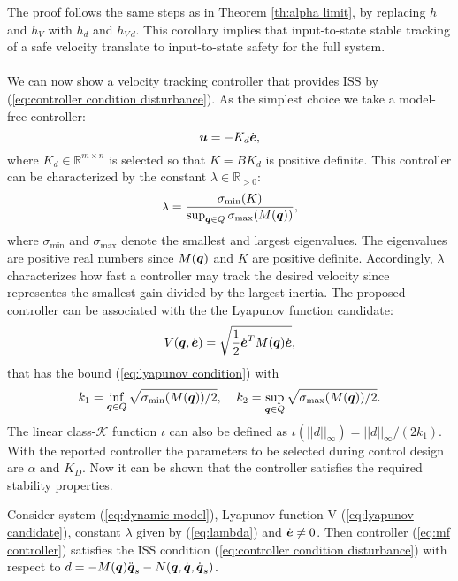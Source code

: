 The proof follows the same steps as in Theorem \ref{th:alpha limit}, by replacing $h$ and $h_V$ with $h_d$ and $h_{V\,d}$. This corollary implies that input-to-state stable tracking of a safe velocity translate to input-to-state safety for the full system.\\
\\
We can now show a velocity tracking controller that provides ISS by (\ref{eq:controller condition disturbance}). As the simplest choice we take a model-free controller:
\begin{equation} \label{eq:mf controller}
    \boldsymbol{u} = -K_d \dot{\boldsymbol{e}},
\end{equation}
where $K_d \in \mathbb{R}^{m \times n}$ is selected so that $K=B K_d$ is positive definite. This controller can be characterized by the constant $\lambda \in \mathbb{R}_{>0}$:
\begin{equation} \label{eq:lambda}
    \lambda = \frac{\sigma_{\min}(K)}{\sup_{{\boldsymbol{q}} \in Q} \sigma_{\max}(M({\boldsymbol{q}}))},
\end{equation}
where $\sigma_{\min}$ and $\sigma_{\max}$ denote the smallest and largest eigenvalues. The eigenvalues are positive real numbers since $M({\boldsymbol{q}})$ and $K$ are positive definite. Accordingly, $\lambda$ characterizes how fast a controller may track the desired velocity since representes the smallest gain divided by the largest inertia. The proposed controller can be associated with the the Lyapunov function candidate:
\begin{equation} \label{eq:lyapunov candidate}
    V({\boldsymbol{q}},\dot{\boldsymbol{e}}) = \sqrt{\frac{1}{2} \dot{\boldsymbol{e}}^T M({\boldsymbol{q}}) \dot{\boldsymbol{e}}},
\end{equation}
that has the bound (\ref{eq:lyapunov condition}) with 
\begin{equation} 
    k_1= \inf_{{\boldsymbol{q}} \in Q} \sqrt{\sigma_{\min} (M({\boldsymbol{q}}))/2}, \;\;\;\; k_2= \sup_{{\boldsymbol{q}} \in Q} \sqrt{\sigma_{\max} (M({\boldsymbol{q}}))/2}.
\end{equation}
The linear class-$\mathcal{K}$ function $\iota$ can also be defined as $\iota(||d||_\infty)=||d||_\infty / (2 k_1)$. With the reported controller the parameters to be selected during control design are $\alpha$ and $K_D$. Now it can be shown that the controller satisfies the required stability properties.
\begin{theorem}
    Consider system (\ref{eq:dynamic model}), Lyapunov function V (\ref{eq:lyapunov candidate}), constant $\lambda$ given by (\ref{eq:lambda}) and $\dot{\boldsymbol{e}} \neq 0$. Then controller (\ref{eq:mf controller}) satisfies the ISS condition (\ref{eq:controller condition disturbance}) with respect to $d = -M({\boldsymbol{q}})\ddot{{\boldsymbol{q}}}_s-N({\boldsymbol{q}},\dot{{\boldsymbol{q}}},\dot{{\boldsymbol{q}}}_s)$.
\end{theorem}
